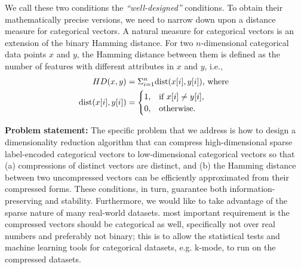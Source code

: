 We call these two conditions the {\em ``well-designed''} conditions. To obtain their mathematically precise versions, we need to narrow down upon a distance measure for categorical vectors. A natural measure for categorical vectors is an extension of the binary Hamming distance. For two $n$-dimensional categorical data points $x$ and $y$, the Hamming distance between them is defined as the number of features with different attributes in $x$ and $y$, i.e., 
\begin{align*}
HD(x, y) &=\Sigma_{i=1}^n \mathrm{dist}(x[i], y[i]) \mbox{, where }\\
\mathrm{dist}(x[i], y[i])&=\begin{cases}
    1, & \text{if~} x[i]\neq y[i], \\
    0, & \text{otherwise}.
  \end{cases}
\end{align*}

{\bf Problem statement:} The specific problem that we address is how to design a dimensionality reduction algorithm that can compress high-dimensional sparse label-encoded categorical vectors to low-dimensional categorical vectors so that (a) compressions of distinct vectors are distinct, and (b) the Hamming distance between two uncompressed vectors can be efficiently approximated from their compressed forms. These conditions, in turn, guarantee both information-preserving and stability. Furthermore, we would like to take advantage of the sparse nature of many real-world datasets.  most important requirement is the compressed vectors should be categorical as well, specifically not over real numbers and preferably not binary; this is to allow the statistical tests and machine learning tools for categorical datasets, e.g. k-mode, to run on the compressed datasets.

